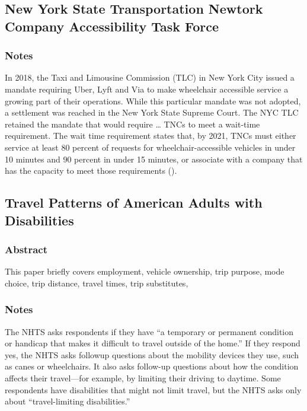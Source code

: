 \documentclass[]{article}
\begin{document}
\hypertarget{new-york-state-transportation-newtork-company-accessibility-task-force}{%
\subsection{New York State Transportation Newtork Company Accessibility
Task
Force}\label{new-york-state-transportation-newtork-company-accessibility-task-force}}

\hypertarget{notes-26}{%
\subsubsection{Notes}\label{notes-26}}

In 2018, the Taxi and Limousine Commission (TLC) in New York City issued
a mandate requiring Uber, Lyft and Via to make wheelchair accessible
service a growing part of their operations. While this particular
mandate was not adopted, a settlement was reached in the New York State
Supreme Court. The NYC TLC retained the mandate that would require
\ldots{} TNCs to meet a wait-time requirement. The wait time requirement
states that, by 2021, TNCs must either service at least 80 percent of
requests for wheelchair-accessible vehicles in under 10 minutes and 90
percent in under 15 minutes, or associate with a company that has the
capacity to meet those requirements ().

\hypertarget{travel-patterns-of-american-adults-with-disabilities}{%
\subsection{Travel Patterns of American Adults with
Disabilities}\label{travel-patterns-of-american-adults-with-disabilities}}

\hypertarget{abstract-27}{%
\subsubsection{Abstract}\label{abstract-27}}

This paper briefly covers employment, vehicle ownership, trip purpose,
mode choice, trip distance, travel times, trip substitutes,

\hypertarget{notes-27}{%
\subsubsection{Notes}\label{notes-27}}

The NHTS asks respondents if they have ``a temporary or permanent
condition or handicap that makes it difficult to travel outside of the
home.'' If they respond yes, the NHTS asks followup questions about the
mobility devices they use, such as canes or wheelchairs. It also asks
follow-up questions about how the condition affects their travel---for
example, by limiting their driving to daytime. Some respondents have
disabilities that might not limit travel, but the NHTS asks only about
``travel-limiting disabilities.''
\end{document}
